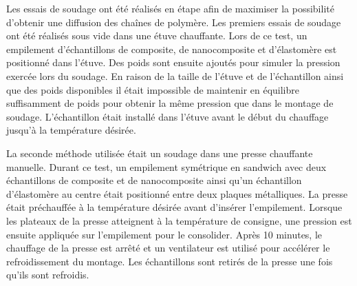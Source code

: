 Les essais de soudage ont été réalisés en étape afin de maximiser la possibilité d'obtenir une diffusion des chaînes de polymère. 
Les premiers essais de soudage ont été réalisés sous vide dans une étuve chauffante. 
Lors de ce test, un empilement d'échantillons de composite, de nanocomposite et d'élastomère est positionné dans l'étuve. 
Des poids sont ensuite ajoutés pour simuler la pression exercée lors du soudage. 
En raison de la taille de l'étuve et de l'échantillon ainsi que des poids disponibles il était impossible de maintenir en équilibre suffisamment de poids pour obtenir la même pression que dans le montage de soudage. 
L'échantillon était installé dans l'étuve avant le début du chauffage jusqu'à la température désirée. 

La seconde méthode utilisée était un soudage dans une presse chauffante manuelle. 
Durant ce test, un empilement symétrique en sandwich avec deux échantillons de composite et de nanocomposite ainsi qu'un échantillon d'élastomère au centre était positionné entre deux plaques métalliques. 
La presse était préchauffée à la température désirée avant d'insérer l'empilement. 
Lorsque les plateaux de la presse atteignent à la température de consigne, une pression est ensuite appliquée sur l'empilement pour le consolider. 
Après 10 minutes, le chauffage de la presse est arrêté et un ventilateur est utilisé pour accélérer le refroidissement du montage. 
Les échantillons sont retirés de la presse une fois qu'ils sont refroidis. 

